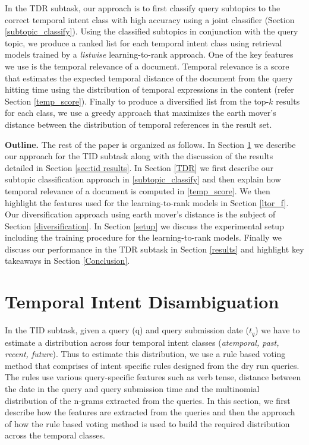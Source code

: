 \documentclass{sig-alternate}
\begin{document}
In the TDR subtask, our approach is to first classify query subtopics to the correct temporal intent class with high accuracy using a joint classifier (Section \ref{subtopic_classify}). Using the classified subtopics in conjunction with the query topic, we produce a ranked list for each temporal intent class using retrieval models trained by a \textit{listwise} learning-to-rank approach. One of the key features we use is the temporal relevance of a document. Temporal relevance is a score that estimates the expected temporal distance of the document from the query hitting time using the distribution of temporal expressions in the content (refer Section \ref{temp_score}). Finally to produce a diversified list from the top-$k$ results for each class, we use a greedy approach that maximizes the earth mover's distance between the distribution of temporal references in the result set.

\textbf{Outline.} The rest of the paper is organized as follows. In Section \ref{TID} we describe our approach for the TID subtask along with the discussion of the results detailed in Section \ref{sec:tid results}.
In Section \ref{TDR} we first describe our subtopic classification approach in \ref{subtopic_classify} and then explain how temporal relevance of a document is computed in \ref{temp_score}. We then highlight the features used for the learning-to-rank models in Section \ref{ltor_f}. Our diversification approach using earth mover's distance is the subject of Section \ref{diversification}. In Section \ref{setup} we discuss the experimental setup including the training procedure for the learning-to-rank models. Finally we discuss our performance in the TDR subtask in Section \ref{results} and highlight key takeaways in Section \ref{Conclusion}.





\section{Temporal Intent Disambiguation}\label{TID}
In the TID subtask, given a query (q) and query submission date ($t_{q}$) we have to estimate a distribution across four temporal intent classes (\textit{atemporal, past, recent, future}). Thus to estimate this distribution, we use a rule based voting method that comprises of intent specific rules designed from the dry run queries. The rules use various query-specific features such as verb tense, distance between the date in the query and query submission time and the multinomial distribution of the n-grams extracted from the queries. In this section, we first describe how the features are extracted from the queries and then the approach of how the rule based voting method is used to build the required distribution across the temporal classes.
\end{document}

